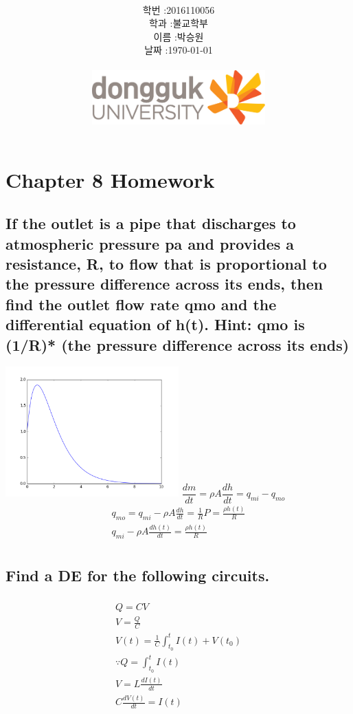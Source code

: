 \documentclass[12pt,a4paper]{article}
\title{
	\centering
	\pgfornament[width=12cm,color=teal]{84}\\
	\vspace{1cm}
	\fontsize{50}{50} \selectfont {정보통신 수학 및 실습\\Homework}\\
		\pgfornament[width=12cm,color=teal]{88}\\
	\vfill}
\author{
	\LARGE
	\begin{tabular}{rl}
		\hline
		학번 : & 2016110056\\ 
		학과 : & 불교학부 \\
		이름 : & 박승원\\
		날짜 : & \today\\
		\hline
	\end{tabular}\vspace{2cm}
	\\
\includegraphics[width=0.5\textwidth]{logo.jpg}
	}
\date{}
\begin{document}
\maketitle
{}
\noindent
\lstset{language=matlab, columns=flexible, tabsize=4, frame=shadowbox, showstringspaces=false, breaklines=true, upquote=true, basicstyle=\normalsize}

\renewcommand{\thesubsubsection}{\alph{subsubsection})}
\renewcommand{\thesubsection}{\arabic{subsection}.}
\newpage

\section*{Chapter 8 Homework}
\subsection{If the outlet is a pipe that discharges to atmospheric pressure pa and provides a resistance, R, to flow that is proportional to the pressure difference across its ends, then find the outlet flow rate qmo and the differential equation of h(t).  Hint: qmo is (1/R)* (the pressure difference across its ends) } 
	
\includegraphics[width=0.5\textwidth]{1.png}
$\dfrac{dm}{dt}=\rho A \dfrac{dh}{dt}=q_{mi}-q_{mo}$
\begin{gather*}
\displaystyle
q_{mo} = q_{mi} - \rho A \frac{dh}{dt}=\frac{1}{R}P = \frac{\rho h(t)}{R}\\
q_{mi}-\rho A \frac{dh(t)}{dt} = \frac{\rho h(t)}{R}\\
\end{gather*}

\subsection{Find a DE for the following circuits.}
\subsubsection{}
\begin{gather*}
\displaystyle
Q = CV\\
V= \frac{Q}{C}\\
V(t) = \frac{1}{C}\int_{t_0}^{t} I(t) + V(t_0)\\
\because Q = \int_{t_0}^t I(t)\\
V = L\frac{dI(t)}{dt}\\
C\frac{dV(t)}{dt} = I(t) 
\end{gather*}
\end{document}
